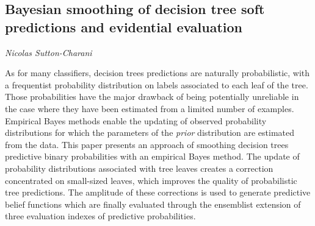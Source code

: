 \documentclass[../booklet.tex]{subfiles}
\begin{document}
\subsection[Bayesian smoothing of decision tree soft predictions and evidential evaluation. {\it Nicolas Sutton-Charani}]{Bayesian smoothing of decision tree soft predictions and evidential evaluation}

\begin{center}
  {\it Nicolas Sutton-Charani}
\end{center}

\vskip 0.8cm


As for many classifiers, decision trees predictions are naturally probabilistic, with a frequentist probability distribution on labels associated to each leaf of the tree. 
	Those probabilities have the major drawback of being potentially unreliable in the case where they have been estimated from a limited number of examples.
	Empirical Bayes methods enable the updating of observed probability distributions for which the parameters of the \textit{prior} distribution are estimated from the data. 
	This paper presents an approach of smoothing decision trees predictive binary probabilities with an empirical Bayes method. 
	The update of probability distributions associated with tree leaves creates a correction concentrated on small-sized leaves, which improves the quality of probabilistic tree predictions.
	The amplitude of these corrections is used to generate predictive belief functions which are finally evaluated through the ensemblist extension of three evaluation indexes of predictive probabilities.

\end{document}
